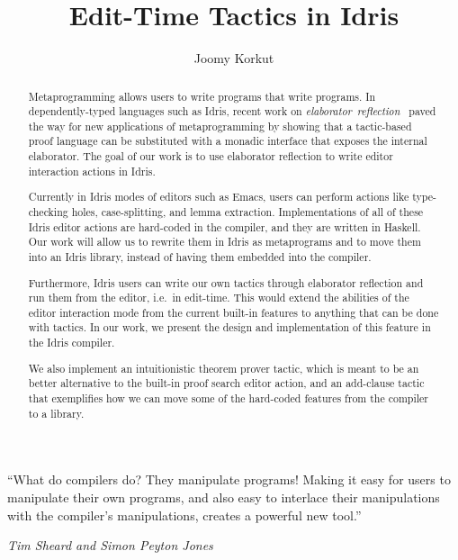 \documentclass[11pt, ma]{westhesis}
\title{Edit-Time Tactics in Idris}
\author{Joomy Korkut}
\newcommand{\forceindent}{\hspace{\parindent}}
\theoremstyle{plain}
\theoremstyle{definition}
\numberwithin{section}{chapter}
\numberwithin{figure}{chapter}
\begin{document}
\begin{abstract}
  \forceindent Metaprogramming allows users to write
  programs that write programs. In dependently-typed languages such as Idris,
  recent work on \mbox{\emph{elaborator reflection}~\cite{elabref}} paved the
  way for new applications of metaprogramming by showing that a tactic-based
  proof language can be substituted with a monadic interface that exposes the
  internal elaborator. The goal of our work is to use elaborator reflection to
  write editor interaction actions in Idris.

  Currently in Idris modes of editors such as Emacs, users can perform actions
  like type-checking holes, case-splitting, and lemma extraction.
  Implementations of all of these Idris editor actions are hard-coded in the
  compiler, and they are written in Haskell. Our work will allow us to rewrite
  them in Idris as metaprograms and to move them into an Idris library,
  instead of having them embedded into the compiler.

  Furthermore, Idris users can write our own tactics through elaborator
  reflection and run them from the editor, i.e.\ in edit-time.
  This would extend the abilities of the editor interaction mode from the
  current built-in features to anything that can be done with tactics.
  In our work, we present the design and implementation of this feature in the
  Idris compiler.

  We also implement an intuitionistic theorem prover tactic, which is meant to
  be an better alternative to the built-in proof search editor action, and an
  add-clause tactic that exemplifies how we can move some of the hard-coded
  features from the compiler to a library.
\end{abstract}

\begin{dedication}
  \epigraph{``What do compilers do? They manipulate programs! Making it easy
  for users to manipulate their own programs, and also easy to interlace their
  manipulations with the compiler’s manipulations, creates a powerful new
  tool.''}{\textit{Tim Sheard and Simon Peyton Jones}~\cite{th}}
\end{dedication}
\end{document}

